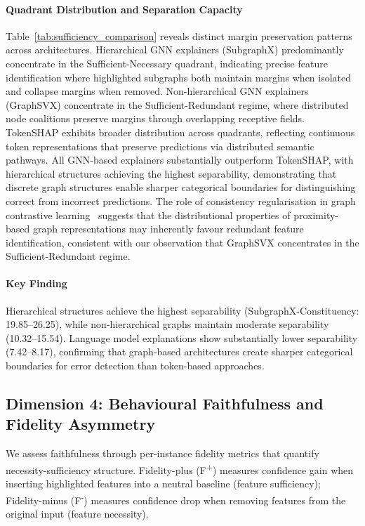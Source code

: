 \documentclass[preprint, times, review, 10pt]{elsarticle}
\begin{document}
\paragraph{Quadrant Distribution and Separation Capacity}
Table~\ref{tab:sufficiency_comparison} reveals distinct margin preservation patterns across architectures. Hierarchical GNN explainers (SubgraphX) predominantly concentrate in the Sufficient-Necessary quadrant, indicating precise feature identification where highlighted subgraphs both maintain margins when isolated and collapse margins when removed. Non-hierarchical GNN explainers (GraphSVX) concentrate in the Sufficient-Redundant regime, where distributed node coalitions preserve margins through overlapping receptive fields. TokenSHAP exhibits broader distribution across quadrants, reflecting continuous token representations that preserve predictions via distributed semantic pathways. All GNN-based explainers substantially outperform TokenSHAP, with hierarchical structures achieving the highest separability, demonstrating that discrete graph structures enable sharper categorical boundaries for distinguishing correct from incorrect predictions. The role of consistency regularisation in graph contrastive learning~\cite{lee2024graph} suggests that the distributional properties of proximity-based graph representations may inherently favour redundant feature identification, consistent with our observation that GraphSVX concentrates in the Sufficient-Redundant regime.

\paragraph{\textbf{Key Finding}}
Hierarchical structures achieve the highest separability (SubgraphX-Constituency: 19.85–26.25), while non-hierarchical graphs maintain moderate separability (10.32–15.54). Language model explanations show substantially lower separability (7.42–8.17), confirming that graph-based architectures create sharper categorical boundaries for error detection than token-based approaches.


\subsection{Dimension 4: Behavioural Faithfulness and Fidelity Asymmetry} \label{sec:dim4}
We assess faithfulness through per-instance fidelity metrics that quantify necessity-sufficiency structure. Fidelity-plus (F\textsuperscript{+}) measures confidence gain when inserting highlighted features into a neutral baseline (feature sufficiency); Fidelity-minus (F\textsuperscript{-}) measures confidence drop when removing features from the original input (feature necessity). 
\end{document}
